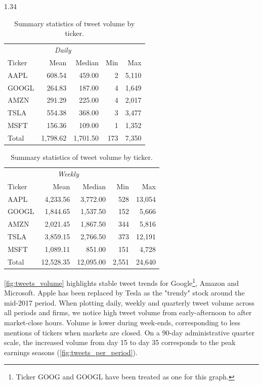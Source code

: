 \documentclass{article}
\begin{document}
\begin{setstretch}{1.34}
\begin{table}[ht]
\centering
\caption{Summary statistics of tweet volume by ticker.}
\label{tab:tweet_volume_summary}
\renewcommand{\arraystretch}{1.1}
\setlength{\tabcolsep}{4pt}
\begin{minipage}{0.45\textwidth}
    \centering
    \begin{tabular}{lrrrr}
    \multicolumn{4}{c}{\textit{Daily}} \\
    Ticker & Mean & Median & Min & Max \\
    \midrule
    AAPL & 608.54 & 459.00 & 2 & 5,110 \\
    GOOGL & 264.83 & 187.00 & 4 & 1,649 \\
    AMZN & 291.29 & 225.00 & 4 & 2,017 \\
    TSLA & 554.38 & 368.00 & 3 & 3,477 \\
    MSFT & 156.36 & 109.00 & 1 & 1,352 \\
    \midrule
    Total & 1,798.62 & 1,701.50 & 173 & 7,350 \\
    \end{tabular}
\end{minipage}
\hspace{0.5cm}
\begin{minipage}{0.45\textwidth}
    \centering
    \begin{tabular}{lrrrr}
    \multicolumn{4}{c}{\textit{Weekly}} \\
    Ticker & Mean & Median & Min & Max \\
    \midrule
    AAPL & 4,233.56 & 3,772.00 & 528 & 13,054 \\
    GOOGL & 1,844.65 & 1,537.50 & 152 & 5,666 \\
    AMZN & 2,021.45 & 1,867.50 & 344 & 5,816 \\
    TSLA & 3,859.15 & 2,766.50 & 373 & 12,191 \\
    MSFT & 1,089.11 & 851.00 & 151 & 4,728 \\
    \midrule
    Total & 12,528.35 & 12,095.00 & 2,551 & 24,640 \\
    \end{tabular}
\end{minipage}
\end{table}



\autoref{fig:tweets_volume} highlights stable tweet trends for Google\footnote{Ticker GOOG and GOOGL have been treated as one for this graph.}, Amazon and Microsoft. Apple has been replaced by Tesla as the "trendy" stock around the mid-2017 period. When plotting daily, weekly and quarterly tweet volume across all periods and firms, we notice high tweet volume from early-afternoon to after market-close hours. Volume is lower during week-ends, corresponding to less mentions of tickers when markets are closed. On a 90-day administrative quarter scale, the increased volume from day 15 to day 35 corresponds to the peak earnings seasons (\autoref{fig:tweets_per_period}). \\


\end{setstretch}
\end{document}
